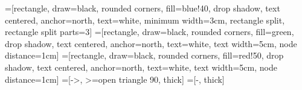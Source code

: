 =[rectangle, draw=black, rounded corners, fill=blue!40, drop
shadow, text centered, anchor=north, text=white, minimum width=3cm,
rectangle split, rectangle split parts=3]
=[rectangle, draw=black, rounded corners, fill=green, drop
shadow, text centered, anchor=north, text=white, text width=5cm, node
distance=1cm] 
=[rectangle, draw=black, rounded corners,
fill=red!50, drop shadow, text centered, anchor=north, text=white, text
width=5cm, node distance=1cm] 
=[->, >=open triangle 90, thick]
=[-, thick]
